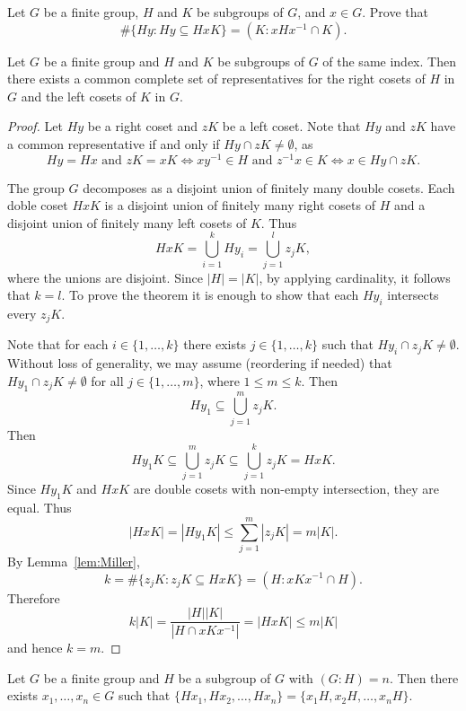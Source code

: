 \begin{exercise}
\label{xca:Miller}
    Let $G$ be a finite group, $H$ and $K$ be subgroups of $G$, and $x\in G$. Prove 
    that 
    \[
    \#\{Hy:Hy\subseteq HxK\}=(K:xHx^{-1}\cap K).
    \]
\end{exercise}

\begin{theorem}[Miller]
    Let $G$ be a finite group and $H$ and $K$ be subgroups of $G$ 
    of the same index. Then there exists a common complete set
    of representatives for the right cosets of $H$ in $G$ and the 
    left cosets of $K$ in $G$. 
\end{theorem}

\begin{proof}
    Let $Hy$ be a right coset and $zK$ be a left coset. Note that 
    $Hy$ and $zK$ have a common representative
    if and only if $Hy\cap zK\ne\emptyset$, as 
    \[
    Hy=Hx\text{ and }zK=xK
    \Longleftrightarrow 
    xy^{-1}\in H\text{ and }z^{-1}x\in K
    \Longleftrightarrow x\in Hy\cap zK.
    \]

    The group $G$ decomposes as a  
    disjoint union of finitely many double cosets. Each doble coset
    $HxK$ is a disjoint union of finitely many right cosets of $H$ 
    and a disjoint union of finitely many left cosets of $K$. Thus 
    \[
    HxK=\bigcup_{i=1}^kHy_i=\bigcup_{j=1}^lz_jK, 
    \]
    where the unions are disjoint. 
    Since $|H|=|K|$, by applying cardinality, it follows that $k=l$. To prove the theorem
    it is enough to show that each $Hy_i$ intersects every $z_jK$. 
    
    Note that for each $i\in\{1,\dots,k\}$ there exists $j\in\{1,\dots,k\}$ such that
    $Hy_i\cap z_jK\ne\emptyset$. 
    Without loss of generality, we may assume (reordering if needed) that 
    $Hy_1\cap z_jK\ne\emptyset$ for all $j\in\{1,\dots,m\}$, where $1\leq m\leq k$. Then
    \[
    Hy_1\subseteq\bigcup_{j=1}^mz_jK. 
    \]
    Then
    \[
    Hy_1K\subseteq\bigcup_{j=1}^mz_jK\subseteq \bigcup_{j=1}^kz_jK=HxK.
    \]
    Since $Hy_1K$ and $HxK$ are double cosets with non-empty intersection, 
    they are equal. Thus 
    \[
    |HxK|=|Hy_1K|\leq \sum_{j=1}^m|z_jK|=m|K|.
    \]
    By Lemma~\ref{lem:Miller}, 
    \[
    k=\#\{z_jK:z_jK\subseteq HxK\}=(H:xKx^{-1}\cap H). 
    \]
    Therefore
    \[
    k|K|=\frac{|H||K|}{|H\cap xKx^{-1}|}=|HxK|\leq m|K|
    \]
    and hence $k=m$. 
\end{proof}

\begin{exercise}[Hall]
\label{xca:Hall:cosets}
    Let $G$ be a finite group and $H$ be a subgroup of $G$ with $(G:H)=n$. 
    Then there exists $x_1,\dots,x_n\in G$ such that 
    $\{Hx_1,Hx_2,\dots,Hx_n\}=\{x_1H,x_2H,\dots,x_nH\}$. 
\end{exercise}

